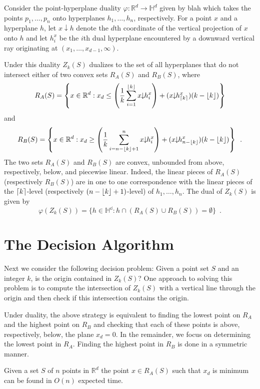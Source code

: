 \documentclass[lotsofwhite]{patmorin}
\newcommand{\drop}{\!\!\downarrow\!\!}
\begin{document}
Consider the point-hyperplane duality
$\varphi:\mathbb{R}^d\rightarrow\mathbb{H}^d$ given by blah \cite{x} which
takes the points $p_1,\ldots,p_n$ onto hyperplanes $h_1,\ldots,h_n$,
respectively.  For a point $x$ and a hyperplane $h$, let $x\drop h$
denote the $d$th coordinate of the vertical projection of $x$ onto $h$
and let $h_i^x$ be the $i$th dual hyperplane encountered by a downward
vertical ray originating at $(x_1,\ldots,x_{d-1},\infty)$.

Under this duality $Z_k(S)$ dualizes to the set of all hyperplanes
that do not intersect either of two convex sets $R_A(S)$ and $R_B(S)$,
where
\[
   R_A(S) = \left\{x\in\mathbb{R}^d: x_d \le 
\left(\frac{1}{k}\sum_{i=1}^{\floor{k}} x\drop h_i^x\right) +
          (x\drop h_{\ceil{k}}^x)(k-\floor{k}) \right\}
\] 
and
\[
   R_B(S) = \left\{x\in\mathbb{R}^d: x_d \ge 
\left(\frac{1}{k}\sum_{i=n-\floor{k}+1}^{n} x\drop h_i^x\right) +
          (x\drop h_{n-\floor{k}}^x)(k-\floor{k}) \right\} \enspace .
\] 
The two sets $R_A(S)$ and $R_B(S)$ are convex, unbounded from above,
respectively, below, and piecewise linear.  Indeed, the linear pieces
of $R_A(S)$ (respectively $R_B(S)$) are in one to one correspondence
with the linear pieces of the $\left\lceil k \right\rceil$-level (respectively
$(n-\left\lfloor k \right\rfloor+1)$-level) of $h_1,\ldots,h_n$.
The dual of $Z_k(S)$ is given by
\[
     \varphi(Z_k(S)) = \{ h\in\mathbb{H^d} : h\cap(R_A(S)\cup R_B(S)) = \emptyset \} \enspace .
\]

\section{The Decision Algorithm}

Next we consider the following decision problem:  Given a point set
$S$ and an integer $k$, is the origin contained in $Z_k(S)$?  One
approach to solving this problem is to compute the intersection of
$Z_k(S)$ with a vertical line through the origin and then check if
this intersection contains the origin. 

Under duality, the above strategy is equivalent to finding the lowest
point on $R_A$ and the highest point on $R_B$ and checking that each
of these points is above, respectively, below, the plane $x_d=0$.
In the remainder, we focus on determining the lowest point in
$R_A$.  Finding the highest point in $R_B$ is done in a symmetric
manner. 

\begin{thm}
Given a set $S$ of $n$ points in $\mathbb{R}^d$ the point $x\in
R_A(S)$ such that $x_d$ is minimum can be found in $O(n)$ expected
time.
\end{thm}
\end{document}
